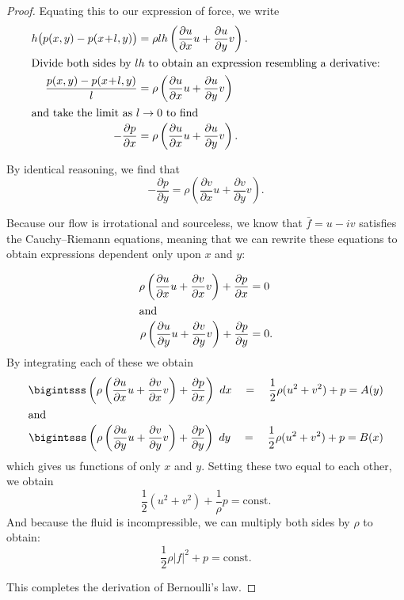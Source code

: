 \documentclass[letterpaper, twoside, 12 pt]{article}
\begin{document}
\begin{proof}
		Equating this to our expression of force, we write
		\begin{align*}
			h \big( p(x, y) - p(x \!+\! l, y) \big) &= \rho lh \left( \frac{\partial u}{\partial x} u + \frac{\partial u}{\partial y} v \right).\\
			\intertext{Divide both sides by $lh$ to obtain an expression resembling a derivative:}
			\frac{p(x, y) - p(x \!+\! l, y)}{l} &= \rho \left( \frac{\partial u}{\partial x} u + \frac{\partial u}{\partial y} v \right) \\
			\intertext{and take the limit as $l \to 0$ to find}
			- \frac{\partial p}{\partial x} &= \rho \left( \frac{\partial u}{\partial x} u + \frac{\partial u}{\partial y} v \right).
		\end{align*}
		
		By identical reasoning, we find that
		\[
			- \frac{\partial p}{\partial y} = \rho \left( \frac{\partial v}{\partial x} u + \frac{\partial v}{\partial y} v \right).
		\]
		
		Because our flow is irrotational and sourceless, we know that $\bar f = u - iv$ satisfies the Cauchy--Riemann equations, meaning that we can rewrite these equations to obtain expressions dependent only upon $x$ and $y$:

		\begin{align*}
			\rho \left( \frac{\partial u}{\partial x} u + \frac{\partial v}{\partial x} v \right) + \frac{\partial p}{\partial x} &= 0 \\
			\intertext{and}
			\rho \left( \frac{\partial u}{\partial y} u + \frac{\partial v}{\partial y} v \right) + \frac{\partial p}{\partial y} &= 0. \\
		\end{align*}
		By integrating each of these we obtain
		\begin{align*}
			\bigintsss \left( \rho \left( \frac{\partial u}{\partial x} u + \frac{\partial v}{\partial x} v \right) + \frac{\partial p}{\partial x} \right) \ dx
			\quad = \quad
			\frac{1}{2} \rho (u^2 + v^2) + p = A(y) \\
			\intertext{and}
			\bigintsss \left( \rho \left( \frac{\partial u}{\partial y} u + \frac{\partial v}{\partial y} v \right) + \frac{\partial p}{\partial y} \right) \ dy
			\quad = \quad
			\frac{1}{2} \rho (u^2 + v^2) + p = B(x) \\
		\end{align*}
		which gives us functions of only $x$ and $y$.
		Setting these two equal to each other, we obtain
		\[
			\frac{1}{2} (u^2 + v^2) + \frac{1}{\rho} p = \mathrm{const.}
		\]
		And because the fluid is incompressible, we can multiply both sides by $\rho$ to obtain:
		\[
			\frac{1}{2} \rho |f|^2 + p = \mathrm{const.}
		\]

		This completes the derivation of Bernoulli's law.
	\end{proof}
\end{document}
